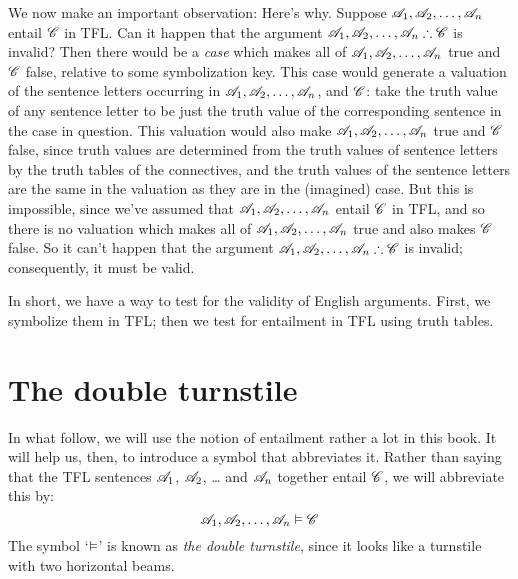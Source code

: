 We now make an important observation:
Here's why. Suppose $\mathscr{A}_1, \mathscr{A}_2, \ldots, \mathscr{A}_n$
entail $\mathscr{C}$ in TFL. Can it happen that the argument
$\metav{A}_1, \metav{A}_2, \ldots, \metav{A}_n \therefore \metav{C}$
is invalid? Then there would be a \emph{case} which makes all of
$\mathscr{A}_1, \mathscr{A}_2, \ldots, \mathscr{A}_n$ true and $\mathscr{C}$
false, relative to some symbolization key. This case would generate a
valuation of the sentence letters occurring in $\mathscr{A}_1,
\mathscr{A}_2, \ldots, \mathscr{A}_n$, and $\mathscr{C}$: take the truth
value of any sentence letter to be just the truth value of the
corresponding sentence in the case in question. This valuation would
also make $\mathscr{A}_1, \mathscr{A}_2, \ldots, \mathscr{A}_n$ true and
$\mathscr{C}$ false, since truth values are determined from the truth
values of sentence letters by the truth tables of the connectives, and
the truth values of the sentence letters are the same in the valuation
as they are in the (imagined) case. But this is impossible, since
we've assumed that $\mathscr{A}_1, \mathscr{A}_2, \ldots, \mathscr{A}_n$
entail $\mathscr{C}$ in TFL, and so there is no valuation which makes
all of $\mathscr{A}_1, \mathscr{A}_2, \ldots, \mathscr{A}_n$ true and also
makes $\mathscr{C}$ false. So it can't happen that the argument
$\metav{A}_1, \metav{A}_2, \ldots, \metav{A}_n \therefore \metav{C}$
is invalid; consequently, it must be valid.

In short, we have a way to test for the validity of English arguments. First, we symbolize them in TFL; then we test for entailment in TFL using truth tables.



\section{The double turnstile}
In what follow, we will use the notion of entailment rather a lot in this book. It will help us, then, to introduce a symbol that abbreviates it. Rather than saying that the TFL sentences $\mathscr{A}_1$, $\mathscr{A}_2$, \dots{} and $\mathscr{A}_n$ together entail $\mathscr{C}$, we will abbreviate this by:
	$$\mathscr{A}_1, \mathscr{A}_2, \dots, \mathscr{A}_n \vDash \mathscr{C}$$
The symbol `$\vDash$' is known as \emph{the double turnstile}, since it looks like a turnstile with two horizontal beams.


